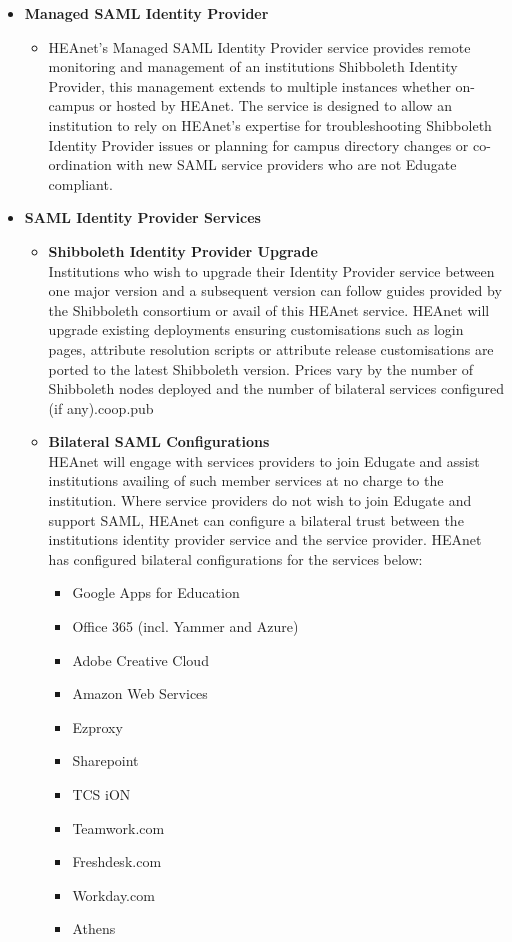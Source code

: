 \documentclass{article}
\begin{document}
\begin{itemize}
\begin{itemize}
		\end{itemize}
		\item \textbf{Managed SAML Identity Provider}
		\begin{itemize}
			\item HEAnet's Managed SAML Identity Provider service provides remote monitoring and management of an institutions Shibboleth Identity Provider, this management extends to multiple instances whether on-campus or hosted by HEAnet. The service is designed to allow an institution to rely on HEAnet's expertise for troubleshooting Shibboleth Identity Provider issues or planning for campus directory changes or co-ordination with new SAML service providers who are not Edugate compliant.
		\end{itemize}
		\newpage
		\item \textbf{SAML Identity Provider Services}
		\begin{itemize}
			\item \textbf{Shibboleth Identity Provider Upgrade}\\
			Institutions who wish to upgrade their Identity Provider service between one major version and a subsequent version can follow guides provided by the Shibboleth consortium or avail of this HEAnet service. HEAnet will upgrade existing deployments ensuring customisations such as login pages, attribute resolution scripts or attribute release customisations are ported to the latest Shibboleth version. Prices vary by the number of Shibboleth nodes deployed and the number of bilateral services configured (if any).coop.pub
			\item \textbf{Bilateral SAML Configurations}\\
			HEAnet will engage with services providers to join Edugate and assist institutions availing of such member services at no charge to the institution. Where service providers do not wish to join Edugate and support SAML, HEAnet can configure a bilateral trust between the institutions identity provider service and the service provider. HEAnet has configured bilateral configurations for the services below:
			\begin{itemize}
				\item Google Apps for Education
				\item Office 365 (incl. Yammer and Azure)
				\item Adobe Creative Cloud
				\item Amazon Web Services
				\item Ezproxy
				\item Sharepoint
				\item TCS iON
				\item Teamwork.com
				\item Freshdesk.com
				\item Workday.com
				\item Athens
				

\end{itemize}
\end{itemize}
\end{itemize}
\end{document}
